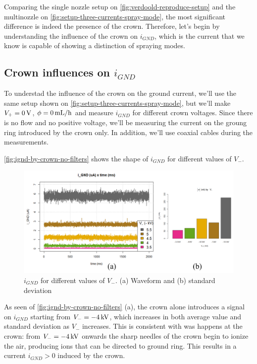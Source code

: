 \documentclass[oneside,12pt]{article}
\begin{document}
Comparing the single nozzle setup on \autoref{fig:verdoold-reproduce-setup} and the multinozzle on \autoref{fig:setup-three-currents-spray-mode}, 
the most significant difference is indeed the presence of the crown. Therefore, let's begin by understanding the influence 
of the crown on $i_{GND}$, which is the current that we know is capable of showing a distinction of spraying 
modes. 

\subsection{Crown influences on $i_{GND}$}

To understad the influence of the crown on the ground current, we'll use the same setup shown on 
\autoref{fig:setup-three-currents-spray-mode}, but we'll make $V_+ = 0 \,\mathrm{V}$, $\phi = 0 \,\mathrm{mL / h}$ and measure $i_{GND}$ for different
crown voltages. Since there is no flow 
and no positive voltage, we'll be measuring the current on the groung ring introduced by the crown only.
In addition, we'll use coaxial cables during the measurements.

\autoref{fig:ignd-by-crown-no-filters} shows the shape of $i_{GND}$ for different values of $V_-$.

\begin{figure}[h!]
    \centering
    \includegraphics[width=1\textwidth,trim=1 1 1 1,clip]{figures/ignd-by-crown-no-filters.png}
    \caption{$i_{GND}$ for different values of $V_-$. (a) Waveform and (b) standard deviation}
    \label{fig:ignd-by-crown-no-filters}
\end{figure}

As seen of \autoref{fig:ignd-by-crown-no-filters} (a), the crown alone introduces a signal on $i_{GND}$ starting
from $V_- = - 4 \,\mathrm{kV}$, which increases in both average value and standard deviation as $V_-$ increases.
This is consistent with was happens at the crown: from $V_- = - 4 \,\mathrm{kV}$ onwards the sharp needles 
of the crown begin to ionize the air, producing ions that can be 
directed to ground ring. This results in a current $i_{GND} > 0$ induced by the crown.
\end{document}
